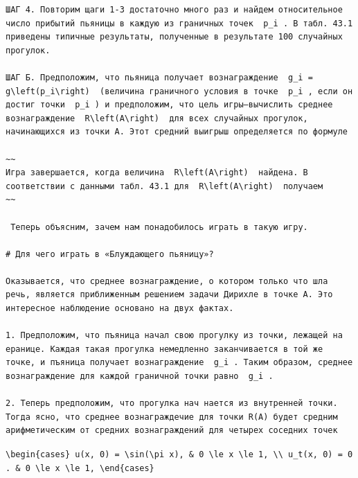 \documentclass[
  ukrainian,
]{article}
\begin{document}
\begin{verbatim}
ШАГ 4. Повторим щаги 1-3 достаточно много раз и найдем относительное число прибытий пьяницы в каждую из граничных точек  p_i . В табл. 43.1 приведены типичные результаты, полученные в результате 100 случайных прогулок.

ШАГ Б. Предположим, что пьяница получает вознаграждение  g_i = g\left(p_i\right)  (величина граничного условия в точке  p_i , если он достиг точки  p_i ) и предположим, что цель игры—вычислить среднее вознаграждение  R\left(A\right)  для всех случайных прогулок, начинающихся из точки A. Этот средний выигрыш определяется по формуле

~~
Игра завершается, когда величина  R\left(A\right)  найдена. В соответствии с данными табл. 43.1 для  R\left(A\right)  получаем
~~

 Теперь объясним, зачем нам понадобилось играть в такую игру.

# Для чего играть в «Блуждающего пьяницу»?

Оказывается, что среднее вознаграждение, о котором только что шла речь, является приближенным решением задачи Дирихле в точке A. Это интересное наблюдение основано на двух фактах.

1. Предположим, что пъяница начал свою прогулку из точки, лежащей на еранице. Каждая такая прогулка немедленно заканчивается в той же точке, и пъяница получает вознаграждение  g_i . Таким образом, среднее вознаграждение для каждой граничной точки равно  g_i .

2. Теперь предположим, что прогулка нач нается из внутренней точки. Тогда ясно, что среднее вознаграждечие для точки R(A) будет средним арифметическим от средних вознаграждений для четырех соседних точек
\end{verbatim}

\texttt{\textbackslash{}begin\{cases\}\ u(x,\ 0)\ =\ \textbackslash{}sin(\textbackslash{}pi\ x),\ \&\ 0\ \textbackslash{}le\ x\ \textbackslash{}le\ 1,\ \textbackslash{}\textbackslash{}\ u\_t(x,\ 0)\ =\ 0.\ \&\ 0\ \textbackslash{}le\ x\ \textbackslash{}le\ 1,\ \textbackslash{}end\{cases\}}
\end{document}
